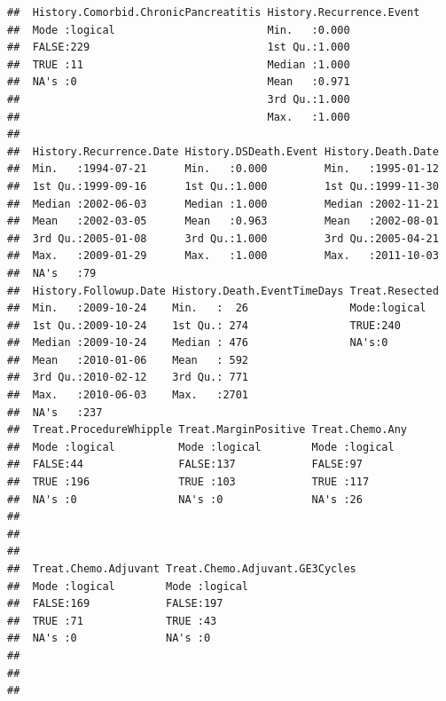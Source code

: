 \documentclass{article}\usepackage[]{graphicx}\usepackage[]{color}
\makeatletter
\newenvironment{kframe}{%
 \def\at@end@of@kframe{}%
 \ifinner\ifhmode%
  \def\at@end@of@kframe{\end{minipage}}%
  \begin{minipage}{\columnwidth}%
 \fi\fi%
 \def\FrameCommand##1{\hskip\@totalleftmargin \hskip-\fboxsep
 \colorbox{shadecolor}{##1}\hskip-\fboxsep
     \hskip-\linewidth \hskip-\@totalleftmargin \hskip\columnwidth}%
 \MakeFramed {\advance\hsize-\width
   \@totalleftmargin\z@ \linewidth\hsize
   \@setminipage}}%
 {\par\unskip\endMakeFramed%
 \at@end@of@kframe}
\newenvironment{knitrout}{}{} %
\makeatother
\begin{document}
\begin{knitrout}
\begin{kframe}
\begin{verbatim}
##  History.Comorbid.ChronicPancreatitis History.Recurrence.Event
##  Mode :logical                        Min.   :0.000           
##  FALSE:229                            1st Qu.:1.000           
##  TRUE :11                             Median :1.000           
##  NA's :0                              Mean   :0.971           
##                                       3rd Qu.:1.000           
##                                       Max.   :1.000           
##                                                               
##  History.Recurrence.Date History.DSDeath.Event History.Death.Date  
##  Min.   :1994-07-21      Min.   :0.000         Min.   :1995-01-12  
##  1st Qu.:1999-09-16      1st Qu.:1.000         1st Qu.:1999-11-30  
##  Median :2002-06-03      Median :1.000         Median :2002-11-21  
##  Mean   :2002-03-05      Mean   :0.963         Mean   :2002-08-01  
##  3rd Qu.:2005-01-08      3rd Qu.:1.000         3rd Qu.:2005-04-21  
##  Max.   :2009-01-29      Max.   :1.000         Max.   :2011-10-03  
##  NA's   :79                                                        
##  History.Followup.Date History.Death.EventTimeDays Treat.Resected
##  Min.   :2009-10-24    Min.   :  26                Mode:logical  
##  1st Qu.:2009-10-24    1st Qu.: 274                TRUE:240      
##  Median :2009-10-24    Median : 476                NA's:0        
##  Mean   :2010-01-06    Mean   : 592                              
##  3rd Qu.:2010-02-12    3rd Qu.: 771                              
##  Max.   :2010-06-03    Max.   :2701                              
##  NA's   :237                                                     
##  Treat.ProcedureWhipple Treat.MarginPositive Treat.Chemo.Any
##  Mode :logical          Mode :logical        Mode :logical  
##  FALSE:44               FALSE:137            FALSE:97       
##  TRUE :196              TRUE :103            TRUE :117      
##  NA's :0                NA's :0              NA's :26       
##                                                             
##                                                             
##                                                             
##  Treat.Chemo.Adjuvant Treat.Chemo.Adjuvant.GE3Cycles
##  Mode :logical        Mode :logical                 
##  FALSE:169            FALSE:197                     
##  TRUE :71             TRUE :43                      
##  NA's :0              NA's :0                       
##                                                     
##                                                     
##                                                     

\end{verbatim}
\end{kframe}
\end{knitrout}
\end{document}
